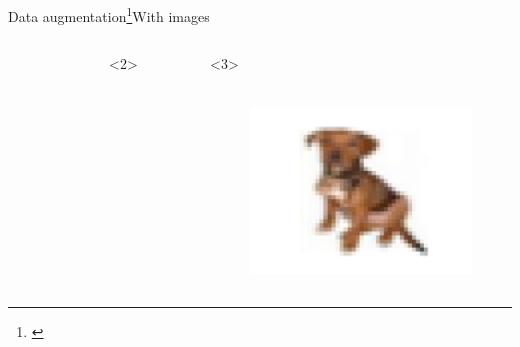 \documentclass[10pt,aspectratio=43]{beamer}
\begin{document}
\begin{frame}{Data augmentation\footnote[frame]{\citet{chollet2018deep}}}{With images}
\begin{onlyenv}
\begin{columns}[t]
\begin{figure}
        \end{figure}
        \column{.5\paperwidth}
        \centering
        \begin{onlyenv}<2>
            \begin{figure}
            \end{figure}
        \end{onlyenv}
        \begin{onlyenv}<3>
            \begin{figure}
                \vspace{-1.2cm}
            \hbox{\hspace{-3em}
            \includegraphics[scale=.4, angle=30, origin]{dog_cifar.pdf}}
            \end{figure}
        \end{onlyenv}
    \end{columns}
    \end{onlyenv}
\end{frame}
\end{document}

